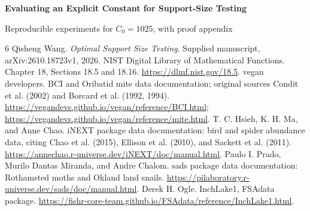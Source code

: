 \documentclass[10pt]{article}
\begin{document}
\begin{center}{\Large\bfseries Evaluating an Explicit Constant for Support-Size Testing\par}\vspace{.4em}
{\normalsize Reproducible experiments for $C_0=1025$, with proof appendix}\end{center}

\clearpage\appendix
\clearpage
\begin{thebibliography}{6}
 Qisheng Wang. \emph{Optimal Support Size Testing}. Supplied manuscript, arXiv:2610.18723v1, 2026.
 NIST Digital Library of Mathematical Functions. Chapter 18, Sections 18.5 and 18.16. \url{https://dlmf.nist.gov/18.5}.
 vegan developers. BCI and Oribatid mite data documentation; original sources Condit et al. (2002) and Borcard et al. (1992, 1994). \url{https://vegandevs.github.io/vegan/reference/BCI.html}; \url{https://vegandevs.github.io/vegan/reference/mite.html}.
 T. C. Hsieh, K. H. Ma, and Anne Chao. iNEXT package data documentation: bird and spider abundance data, citing Chao et al. (2015), Ellison et al. (2010), and Sackett et al. (2011). \url{https://annechao.r-universe.dev/iNEXT/doc/manual.html}.
 Paulo I. Prado, Murilo Dantas Miranda, and Andre Chalom. sads package data documentation: Rothamsted moths and Okland land snails. \url{https://pilaboratory.r-universe.dev/sads/doc/manual.html}.
 Derek H. Ogle. InchLake1, FSAdata package. \url{https://fishr-core-team.github.io/FSAdata/reference/InchLake1.html}.
\end{thebibliography}
\end{document}
